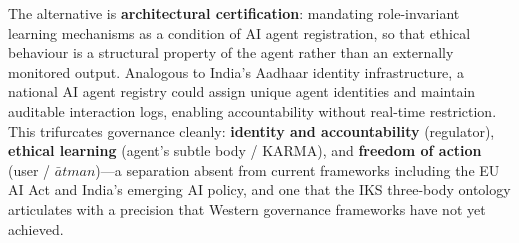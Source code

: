 \documentclass[runningheads]{llncs}
\begin{document}
The alternative is \textbf{architectural certification}: mandating role-invariant
learning mechanisms as a condition of AI agent registration, so that ethical
behaviour is a structural property of the agent rather than an externally
monitored output. Analogous to India's Aadhaar identity infrastructure, a
national AI agent registry could assign unique agent identities and maintain
auditable interaction logs, enabling accountability without real-time
restriction. This trifurcates governance cleanly: \textbf{identity and
accountability} (regulator), \textbf{ethical learning} (agent's subtle body /
KARMA), and \textbf{freedom of action} (user / $\bar{a}tman$)---a separation
absent from current frameworks including the EU AI Act and India's emerging AI
policy, and one that the IKS three-body ontology articulates with a precision
that Western governance frameworks have not yet achieved.
\end{document}
